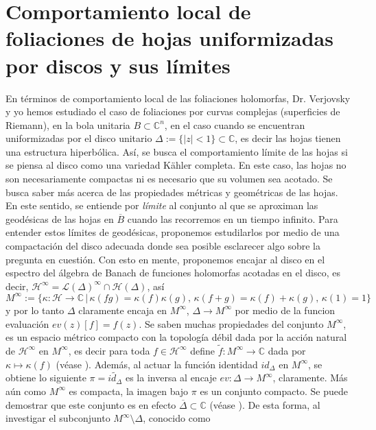 \documentclass{article}
\newcommand{\co}{\ensuremath{\mathbb C }}
\begin{document}
\section{Comportamiento local de foliaciones de hojas uniformizadas por discos y sus l\'imites}

\noindent En t\'erminos de comportamiento local de las foliaciones holomorfas, Dr. Verjovsky y yo hemos estudiado el caso de foliaciones por 
curvas complejas (superficies de Riemann), en la bola unitaria $B\subset\co^n$, en el caso cuando se encuentran uniformizadas por el 
disco unitario $\Delta:=\{|z|< 1\}\subset\co$, es decir las hojas tienen una estructura hiperb\'olica. As\'i, se busca el comportamiento 
l\'imite de las hojas si se piensa al disco como una variedad K\"ahler completa. En este caso, las hojas no son necesariamente compactas 
ni es necesario que su volumen sea acotado. Se busca saber m\'as acerca de las propiedades m\'etricas y geom\'etricas de las hojas. 
En este sentido, se entiende por \emph{l\'imite} al conjunto al que se aproximan las geod\'esicas de las hojas en $\overline{B}$ cuando las recorremos 
en un tiempo infinito.
Para entender estos l\'imites de geod\'esicas, proponemos estudilarlos por medio de una compactaci\'on del disco adecuada donde 
sea posible esclarecer algo sobre la pregunta en cuesti\'on. Con esto en mente, proponemos encajar al disco en el espectro 
del \'algebra de Banach de funciones holomorfas acotadas en el disco, es decir, $\mathcal{H}^{\infty}=\mathcal{L}(\Delta)^{\infty}\cap\mathcal{H}(\Delta)$, 
as\'i \hbox{$M^{\infty}:=\{\kappa:\mathcal{H}\rightarrow\co\,|\,\kappa(fg)=\kappa(f)\kappa(g),\,\kappa(f+g)=\kappa(f)+\kappa(g),\,\kappa(1)=1\}$} y por lo tanto $\Delta$ claramente encaja 
en $M^{\infty}$, $\Delta\rightarrow M^{\infty}$ por medio de la funcion evaluaci\'on $ev(z)[f]=f(z)$. 
Se saben muchas propiedades del conjunto $M^{\infty}$, es un espacio m\'etrico compacto con la topolog\'ia d\'ebil dada por 
la acci\'on natural de $\mathcal{H}^{\infty}$ en $M^{\infty}$, es decir para toda $f\in\mathcal{H}^{\infty}$ define $\tilde{f}:M^{\infty}\rightarrow\co$ dada por $\kappa\mapsto\kappa(f)$ (v\'ease \cite{SCHARK}). 
Adem\'as, al actuar la funci\'on identidad $id_{\Delta}$ en $M^{\infty}$, se obtiene lo siguiente $\pi=\tilde{id_{\Delta}}$ 
es la inversa al encaje $ev:\Delta\rightarrow M^{\infty}$, claramente. 
M\'as a\'un como $M^{\infty}$ es compacta, la imagen bajo $\pi$ es un conjunto compacto. Se puede demostrar que este conjunto es en efecto
$\overline{\Delta}\subset\co$ (v\'ease \cite{SCHARK}). De esta forma, al investigar el subconjunto $M^{\infty}\setminus\Delta$, conocido como 
\end{document}

